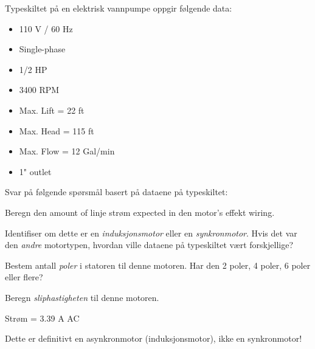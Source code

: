 

Typeskiltet på en elektrisk vannpumpe oppgir følgende data:

\begin{itemize}
\item{} 110 V / 60 Hz
\item{} Single-phase
\item{} 1/2 HP
\item{} 3400 RPM
\item{} Max. Lift = 22 ft
\item{} Max. Head = 115 ft
\item{} Max. Flow = 12 Gal/min
\item{} 1" outlet
\end{itemize}

\vskip 10pt

\noindent
Svar på følgende spørsmål basert på dataene på typeskiltet:

\vskip 10pt

Beregn den amount of linje strøm expected in den motor's effekt wiring.

\vskip 10pt

Identifiser om dette er en {\it induksjonsmotor} eller en {\it synkronmotor}. Hvis det var den {\it andre} motortypen, hvordan ville dataene på typeskiltet vært forskjellige?

\vskip 10pt

Bestem antall {\it poler} i statoren til denne motoren. Har den 2 poler, 4 poler, 6 poler eller flere?

\vskip 10pt

Beregn {\it sliphastigheten} til denne motoren.

\vskip 10pt







Strøm = 3.39 A AC

\vskip 10pt

Dette er definitivt en asynkronmotor (induksjonsmotor), ikke en synkronmotor!
 







